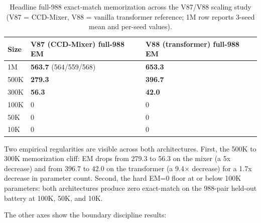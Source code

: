 \documentclass[11pt]{article}
\begin{document}
\begin{table}[!t]
\centering\small
\caption{Headline full-988 exact-match memorization across the V87/V88 scaling study (V87 = CCD-Mixer, V88 = vanilla transformer reference; 1M row reports 3-seed mean and per-seed values).}
\label{tab:scaling-em}
\begin{tabular}{lll}
\toprule
Size & V87 (CCD-Mixer) full-988 EM & V88 (transformer) full-988 EM \\
\midrule
1M & \textbf{563.7} (564/559/568) & \textbf{653.3} \\
500K & \textbf{279.3} & \textbf{396.7} \\
300K & \textbf{56.3} & \textbf{42.0} \\
100K & 0 & 0 \\
50K & 0 & 0 \\
10K & 0 & 0 \\
\bottomrule
\end{tabular}
\end{table}

Two empirical regularities are visible across both architectures. First, the 500K to 300K memorization cliff: EM drops from 279.3 to 56.3 on the mixer (a 5x decrease) and from 396.7 to 42.0 on the transformer (a 9.4$\times$ decrease) for a 1.7x decrease in parameter count. Second, the hard EM=0 floor at or below 100K parameters: both architectures produce zero exact-match on the 988-pair held-out battery at 100K, 50K, and 10K.

The other axes show the boundary discipline results:
\end{document}
